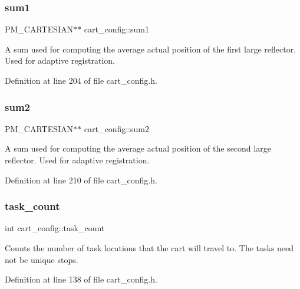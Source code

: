\subsubsection{\texorpdfstring{sum1}{sum1}}
{\footnotesize\ttfamily P\+M\+\_\+\+C\+A\+R\+T\+E\+S\+I\+AN$\ast$$\ast$ cart\+\_\+config\+::sum1\hspace{0.3cm}{\ttfamily [private]}}

A sum used for computing the average actual position of the first large reflector. Used for adaptive registration. 

Definition at line 204 of file cart\+\_\+config.\+h.

\mbox{\label{classcart__config_aa45f914752bd0cdfa4d7473be5d15a78}} 
\subsubsection{\texorpdfstring{sum2}{sum2}}
{\footnotesize\ttfamily P\+M\+\_\+\+C\+A\+R\+T\+E\+S\+I\+AN$\ast$$\ast$ cart\+\_\+config\+::sum2\hspace{0.3cm}{\ttfamily [private]}}

A sum used for computing the average actual position of the second large reflector. Used for adaptive registration. 

Definition at line 210 of file cart\+\_\+config.\+h.

\mbox{\label{classcart__config_a54560028df17adebca7d034b3b246f45}} 
\subsubsection{\texorpdfstring{task\+\_\+count}{task\_count}}
{\footnotesize\ttfamily int cart\+\_\+config\+::task\+\_\+count\hspace{0.3cm}{\ttfamily [private]}}

Counts the number of task locations that the cart will travel to. The tasks need not be unique stops. 

Definition at line 138 of file cart\+\_\+config.\+h.

\mbox{\label{classcart__config_a68c64182da792f9eb4475705a228aae0}} 
